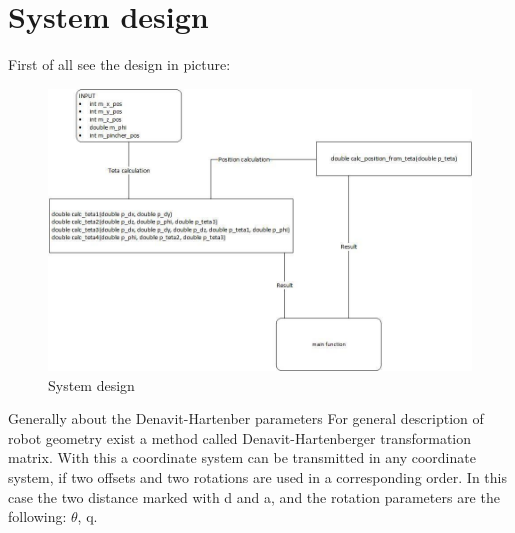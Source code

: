 \chapter{System design} \label{ch:sys_design}

	\hspace{15pt}First of all see the design in picture:

		\begin{figure}[h]
			\centering
			\includegraphics[width=\textwidth]{./images/system_design}
			\caption{System design}
		\end{figure}

	Generally about the Denavit-Hartenber parameters
For general description of robot geometry exist a method called Denavit-Hartenberger transformation matrix. With this a coordinate system can be transmitted in any coordinate system, if two offsets and two rotations are used in a corresponding order. In this case the two distance marked with d and a, and the rotation parameters are the following: $\theta$, q. \\



